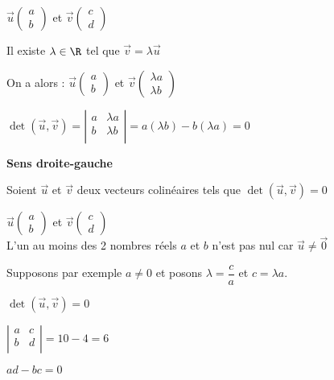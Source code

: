 $\vec{u}\left(\begin{array}{c} a\\ b \end{array}\right)$ et $\vec{v}\left(\begin{array}{c} c\\ d \end{array}\right)$

Il existe $\lambda \in \R$ tel que $\vec{v} = \lambda \vec{u} $

On a alors : $\vec{u}\left(\begin{array}{c} a\\ b \end{array}\right)$ et $\vec{v}\left(\begin{array}{c} \lambda a\\ \lambda b \end{array}\right)$

$\det\left(\vec{u}, \vec{v}\right) = \left| \begin{array}{cc}  a & \lambda a \\ b & \lambda b  \\ \end{array} \right| = a \left(\lambda b\right) - b \left(\lambda a\right)= 0 $

\textbf{Sens droite-gauche}

Soient $\vec{u}$ et $\vec{v}$ deux vecteurs colinéaires tels que $\det(\vec{u}, \vec{v})=0$

$\vec{u}\left(\begin{array}{c} a\\ b \end{array}\right)$ et $\vec{v}\left(\begin{array}{c} c\\ d \end{array}\right)$ \\

L'un au moins des 2 nombres réels $a$ et $b$ n'est pas nul car $\vec{u} \neq \overrightarrow{0} $

Supposons par exemple $a \neq 0$ et posons $\lambda = \dfrac{c}{a}$ et $c = \lambda a$.

$\det (\vec{u}, \vec{v}) = 0$

$\left| \begin{array}{cc}  a & c \\ b & d  \\ \end{array} \right| = 10 - 4 = 6 $

$ad - bc = 0$

